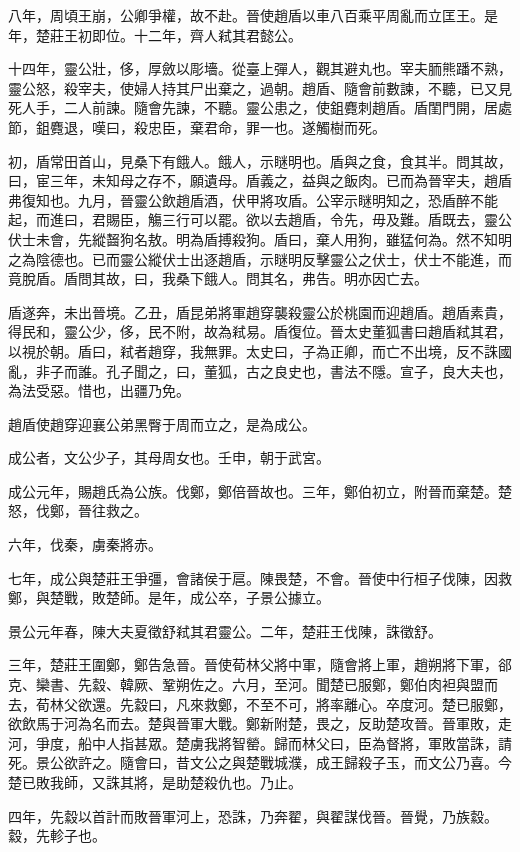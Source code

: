 八年，周頃王崩，公卿爭權，故不赴。晉使趙盾以車八百乘平周亂而立匡王。是年，楚莊王初即位。十二年，齊人弒其君懿公。

十四年，靈公壯，侈，厚斂以彫墻。從臺上彈人，觀其避丸也。宰夫胹熊蹯不熟，靈公怒，殺宰夫，使婦人持其尸出棄之，過朝。趙盾、隨會前數諫，不聽，已又見死人手，二人前諫。隨會先諫，不聽。靈公患之，使鉏麑刺趙盾。盾閨門開，居處節，鉏麑退，嘆曰，殺忠臣，棄君命，罪一也。遂觸樹而死。

初，盾常田首山，見桑下有餓人。餓人，示瞇明也。盾與之食，食其半。問其故，曰，宦三年，未知母之存不，願遺母。盾義之，益與之飯肉。已而為晉宰夫，趙盾弗復知也。九月，晉靈公飲趙盾酒，伏甲將攻盾。公宰示瞇明知之，恐盾醉不能起，而進曰，君賜臣，觴三行可以罷。欲以去趙盾，令先，毋及難。盾既去，靈公伏士未會，先縱齧狗名敖。明為盾搏殺狗。盾曰，棄人用狗，雖猛何為。然不知明之為陰德也。已而靈公縱伏士出逐趙盾，示瞇明反擊靈公之伏士，伏士不能進，而竟脫盾。盾問其故，曰，我桑下餓人。問其名，弗告。明亦因亡去。

盾遂奔，未出晉境。乙丑，盾昆弟將軍趙穿襲殺靈公於桃園而迎趙盾。趙盾素貴，得民和，靈公少，侈，民不附，故為弒易。盾復位。晉太史董狐書曰趙盾弒其君，以視於朝。盾曰，弒者趙穿，我無罪。太史曰，子為正卿，而亡不出境，反不誅國亂，非子而誰。孔子聞之，曰，董狐，古之良史也，書法不隱。宣子，良大夫也，為法受惡。惜也，出疆乃免。

趙盾使趙穿迎襄公弟黑臀于周而立之，是為成公。

成公者，文公少子，其母周女也。壬申，朝于武宮。

成公元年，賜趙氏為公族。伐鄭，鄭倍晉故也。三年，鄭伯初立，附晉而棄楚。楚怒，伐鄭，晉往救之。

六年，伐秦，虜秦將赤。

七年，成公與楚莊王爭彊，會諸侯于扈。陳畏楚，不會。晉使中行桓子伐陳，因救鄭，與楚戰，敗楚師。是年，成公卒，子景公據立。

景公元年春，陳大夫夏徵舒弒其君靈公。二年，楚莊王伐陳，誅徵舒。

三年，楚莊王圍鄭，鄭告急晉。晉使荀林父將中軍，隨會將上軍，趙朔將下軍，郤克、欒書、先縠、韓厥、鞏朔佐之。六月，至河。聞楚已服鄭，鄭伯肉袒與盟而去，荀林父欲還。先縠曰，凡來救鄭，不至不可，將率離心。卒度河。楚已服鄭，欲飲馬于河為名而去。楚與晉軍大戰。鄭新附楚，畏之，反助楚攻晉。晉軍敗，走河，爭度，船中人指甚眾。楚虜我將智罃。歸而林父曰，臣為督將，軍敗當誅，請死。景公欲許之。隨會曰，昔文公之與楚戰城濮，成王歸殺子玉，而文公乃喜。今楚已敗我師，又誅其將，是助楚殺仇也。乃止。

四年，先縠以首計而敗晉軍河上，恐誅，乃奔翟，與翟謀伐晉。晉覺，乃族縠。縠，先軫子也。

